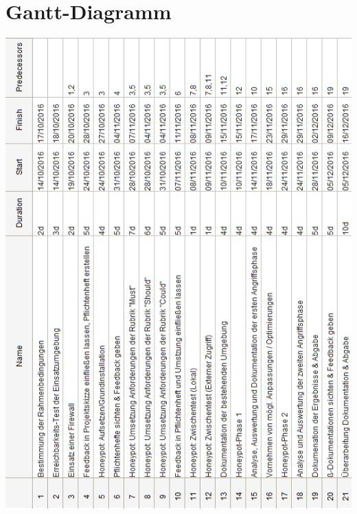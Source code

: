 \chapter{Gantt-Diagramm}
\label{ch:Gantt-Diagramm}

\begin{center}
\includegraphics[scale=0.83]{img/gantt_tasks.png}
\end{center}

\newpage

